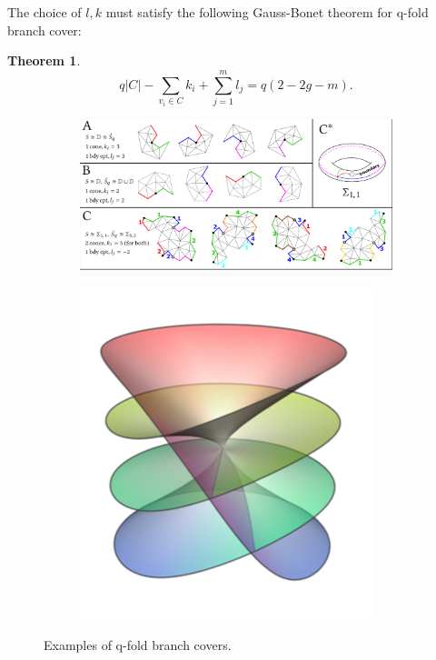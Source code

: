 \documentclass[fleqn,10pt]{wlscirep}
\newtheorem{theorem}{Theorem}[section]
\begin{document}
The choice of $l,k$ must satisfy the following Gauss-Bonet theorem for q-fold branch cover:
\begin{theorem}
$$q|C|- \sum_{v_i \in C} k_i + \sum_{j=1 }^m l_j =q(2-2g -m).$$
\end{theorem}

\begin{figure}
\begin{subfigure}[b]{0.7\textwidth}
\centering
\includegraphics[width=\textwidth]{images/q-folds}
\end{subfigure}
\begin{subfigure}[b]{0.2\textwidth}
\centering
\includegraphics[width=\textwidth]{images/q-fold}
\end{subfigure}
\caption{Examples of q-fold branch covers.}
\label{fig:q-fold}
\end{figure}
\end{document}
